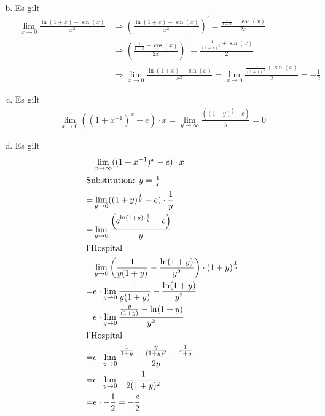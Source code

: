 \documentclass{article}
\begin{document}
\begin{enumerate}[(a)]
\begin{align*}
	\end{align*}
	\item Es gilt
	\begin{align*}
		\lim\limits_{x \rightarrow 0}\frac{\ln(1+x)-\sin(x)}{x^2} &\Longrightarrow \left(\frac{\ln(1+x)-\sin(x)}{x^2}\right)^{'} = \frac{\frac{1}{1+x}-\cos(x)}{2x}\\ &\Longrightarrow
		\left(\frac{\frac{1}{1+x}-\cos(x)}{2x}\right)^{'}=
		\frac{\frac{-1}{(1+x)^2}+\sin(x)}{2}\\
		&\Longrightarrow	\lim\limits_{x \rightarrow 0}\frac{\ln(1+x)-\sin(x)}{x^2} = \lim\limits_{x \rightarrow 0}\frac{\frac{-1}{(1+x)^2}+\sin(x)}{2} = -\frac{1}{2} 
	\end{align*}
	\item Es gilt
	\begin{align*} \lim\limits_{x \rightarrow 0}((1+x^{-1})^{x}-e)\cdot x = \lim\limits_{y \rightarrow \infty}\frac{((1+y)^{\frac{1}{y}}-e)}{y}=0\end{align*}
	\item Es gilt
	\begin{align*}
		&\lim\limits_{x\to\infty} ((1+x^{-1})^x - e)\cdot x\\
		\intertext{Substitution: $y = \frac{1}{x}$}
		=&\lim\limits_{y\to 0} ((1+y)^\frac{1}{y} - e)\cdot \frac{1}{y}\\
		=&\lim\limits_{y\to 0} \frac{\left(e^{\ln(1+y)\cdot \frac{1}{y}} - e\right)}{y}\\
		\intertext{l'Hospital}
		=&\lim\limits_{y\to 0} \left(\frac{1}{y(1+y)} - \frac{\ln(1+y)}{y^2}\right)\cdot (1+y)^\frac{1}{y}\\
		=&e \cdot \lim\limits_{y\to 0} \frac{1}{y(1+y)} - \frac{\ln(1+y)}{y^2}\\
		&e \cdot \lim\limits_{y\to 0} \frac{\frac{y}{(1+y)} - \ln(1+y)}{y^2}\\
		\intertext{l'Hospital}
		=&e \cdot \lim\limits_{y\to 0} \frac{\frac{1}{1+y} - \frac{y}{(1+y)^2} - \frac{1}{1+y}}{2y}\\
		=&e \cdot \lim\limits_{y\to 0} -\frac{1}{2(1+y)^2}\\
		=&e \cdot -\frac{1}{2} = -\frac{e}{2}\\
	\end{align*}
	\end{enumerate}
\end{document}
